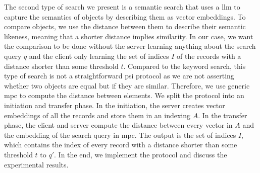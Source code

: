 The second type of search we present is a semantic search that uses a \acrshort{llm} to capture the semantics of objects by describing them as vector embeddings. To compare objects, we use the distance between them to describe their semantic likeness, meaning that a shorter distance implies similarity. In our case, we want the comparison to be done without the server learning anything about the search query $ q $ and the client only learning the set of indices $ I $ of the records with a distance shorter than some threshold $ t $. Compared to the keyword search, this type of search is not a straightforward \acrshort{psi} protocol as we are not asserting whether two objects are equal but if they are similar. Therefore, we use generic \acrshort{mpc} to compute the distance between elements. We split the protocol into an initiation and transfer phase. In the initiation, the server creates vector embeddings of all the records and store them in an indexing $ A $. In the transfer phase, the client and server compute the distance between every vector in $ A $ and the embedding of the search query in \acrshort{mpc}. The output is the set of indices $ I $, which contains the index of every record with a distance shorter than some threshold $ t $ to $ q' $. In the end, we implement the protocol and discuss the experimental results.

